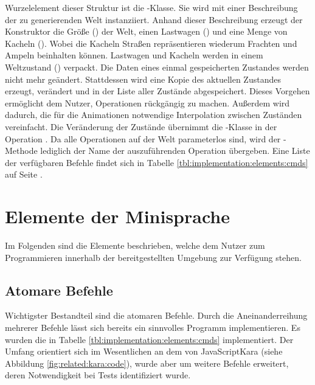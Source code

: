 Wurzelelement dieser Struktur ist die -Klas\-se. Sie wird mit einer Beschreibung der zu generierenden Welt instanziiert. Anhand dieser Beschreibung erzeugt der Konstruktor die Größe () der Welt, einen Lastwagen () und eine Menge von Kacheln (). Wobei die Kacheln Straßen repräsentieren wiederum Frachten und Ampeln beinhalten können. Lastwagen und Kacheln werden in einem Weltzustand () verpackt. Die Daten eines einmal gespeicherten Zustandes werden nicht mehr geändert. Stattdessen wird eine Kopie des aktuellen Zustandes erzeugt, verändert und in der Liste aller Zustände abgespeichert. Dieses Vorgehen ermöglicht dem Nutzer, Operationen rückgängig zu machen. Außerdem wird dadurch, die für die Animationen  notwendige Interpolation zwischen Zuständen vereinfacht. Die Veränderung der Zustände übernimmt die -Klas\-se in der Operation . Da alle Operationen auf der Welt parameterlos sind, wird der -Me\-tho\-de lediglich der Name der auszuführenden Operation übergeben. Eine Liste der verfügbaren Befehle findet sich in Tabelle \ref{tbl:implementation:elements:cmds} auf Seite \pageref{tbl:implementation:elements:cmds}.

\section{Elemente der Minisprache}
\label{sec:implementation:elements}

Im Folgenden sind die Elemente beschrieben, welche dem Nutzer zum Programmieren innerhalb der bereitgestellten Umgebung zur Verfügung stehen.

\subsection*{Atomare Befehle}
\label{sec:implementation:elements:cmds}

Wichtigster Bestandteil sind die atomaren Befehle. Durch die Aneinanderreihung mehrerer Befehle lässt sich bereits ein sinnvolles Programm implementieren. Es wurden die in Tabelle \ref{tbl:implementation:elements:cmds} implementiert. Der Umfang orientiert sich im Wesentlichen an dem von JavaScriptKara (siehe Abbildung \ref{fig:related:kara:code}), wurde aber um weitere Befehle erweitert, deren Notwendigkeit bei Tests identifiziert wurde.


